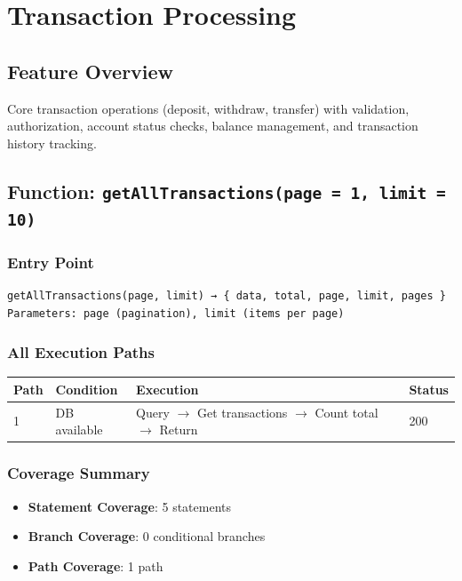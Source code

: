 \chapter{Transaction Processing}

\section{Feature Overview}
Core transaction operations (deposit, withdraw, transfer) with validation, authorization, account status checks, balance management, and transaction history tracking.

\section{Function: \texttt{getAllTransactions(page = 1, limit = 10)}}

\subsection{Entry Point}
\begin{verbatim}
getAllTransactions(page, limit) → { data, total, page, limit, pages }
Parameters: page (pagination), limit (items per page)
\end{verbatim}

\subsection{All Execution Paths}

\begin{longtable}{|L{0.8cm}|L{3.5cm}|L{6cm}|L{1.5cm}|}
\hline
\textbf{Path} & \textbf{Condition} & \textbf{Execution} & \textbf{Status} \\
 & DB available & Query $\rightarrow$ Get transactions $\rightarrow$ Count total $\rightarrow$ Return & 200 \\
\hline
\end{longtable}

\subsection{Coverage Summary}
\begin{itemize}
    \item \textbf{Statement Coverage}: 5 statements
    \item \textbf{Branch Coverage}: 0 conditional branches
    \item \textbf{Path Coverage}: 1 path
\end{itemize}

